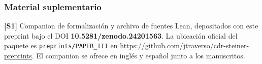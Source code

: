 \documentclass[spanish,11pt,a4paper]{article}
\begin{document}
\subsubsection{Material suplementario}\label{material-suplementario}

\textbf{{[}S1{]}} Companion de formalización y archivo de fuentes Lean, depositados con este preprint bajo el DOI \textbf{10.5281/zenodo.24201563}. La ubicación oficial del paquete es \texttt{preprints/\allowbreak{}PAPER\_\allowbreak{}III} en \url{https://github.com/jtraverso/cdr-steiner-preprints}. El companion se ofrece en inglés y español junto a los manuscritos.

\endgroup
\end{document}
